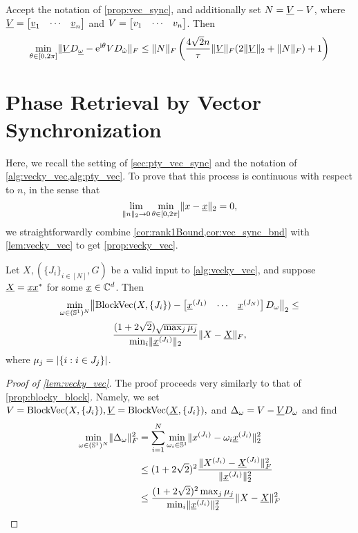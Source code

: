 \begin{corollary}
  Accept the notation of \cref{prop:vec_sync}, and additionally set $N = \underline{V} - V$, where $\underline{V} = \begin{bmatrix} \underline{v}_{1} & \cdots & \underline{v}_{n} \end{bmatrix}$ and $V = \begin{bmatrix} v_{1} & \cdots & v_{n} \end{bmatrix}$.  Then \begin{equation} \min_{\theta \in [0, 2\pi]} \lVert\underline{V} D_{\underline{\omega}} - \mathrm{e}^{\mathrm{i} \theta} V D_{\hat{\omega}}\rVert_F \le  \lVert N\rVert_F \left(\dfrac{4 \sqrt{2} n}{\tau} \lVert\underline{V}\rVert_F (2 \lVert\underline{V}\rVert_2 + \lVert N\rVert_F) + 1\right) \label{eq:vec_sync_bnd} \end{equation} \label{cor:vec_sync_bnd}
\end{corollary}

\section{Phase Retrieval by Vector Synchronization}
\label{app:vecky_vec}
Here, we recall the setting of \cref{sec:pty_vec_sync} and the notation of \cref{alg:vecky_vec,alg:pty_vec}.  To prove that this process is continuous with respect to $n$, in the sense that \[\lim_{\lVert n\rVert_2 \to 0} \min_{\theta \in [0, 2\pi]} \lVert x - \underline{x}\rVert_2 = 0,\] we straightforwardly combine \cref{cor:rank1Bound,cor:vec_sync_bnd} with \cref{lem:vecky_vec} to get \cref{prop:vecky_vec}.

\begin{lemma} \label{lem:vecky_vec}
  Let $X, (\{J_i\}_{i \in [N]}, G)$ be a valid input to \cref{alg:vecky_vec}, and suppose $\underline{X} = \underline{x} \underline{x}^*$ for some $\underline{x} \in \mathbb{C}^d$.  Then \begin{equation}\begin{gathered}\min_{\omega \in (\Sbb^1)^N} \norm*{\BlkVec(X, \{J_i\}) - \rowmatfl{\ux^{(J_1)}}{\ux^{(J_N)}} D_\omega}_2 \le \\ \dfrac{(1 + 2 \sqrt{2}) \sqrt{\max_j \mu_j}}{\min_i \norm{\ux^{(J_i)}}_2} \norm{X - \uX}_F,\end{gathered} \label{eq:vecky_vec_diff} \end{equation} where $\mu_j = \lvert\{i : i \in J_j\}\rvert$.
\end{lemma}

\begin{proof}[Proof of \cref{lem:vecky_vec}]
  The proof proceeds very similarly to that of \cref{prop:blocky_block}.  Namely, we set $V = \operatorname{BlockVec}(X, \{J_i\}), \underline{V} = \operatorname{BlockVec}(\underline{X}, \{J_i\}),$ and $\Delta_\omega = V - \underline{V} D_\omega$ and find
  \begin{align*}
    \min_{\omega \in (\mathbb{S}^1)^N} \lVert\Delta_\omega\rVert_F^2 &= \sum_{i = 1}^N \min_{\omega_i \in \mathbb{S}^1} \lVert x^{(J_i)} - \omega_i \underline{x}^{(J_i)}\rVert_2^2 \\
    &\le (1 + 2 \sqrt{2})^2 \dfrac{\lVert X^{(J_i)} - \underline{X}^{(J_i)}\rVert_F^2}{\lVert\underline{x}^{(J_i)}\rVert_2^2} \\
    &\le \frac{(1 + 2 \sqrt{2})^2 \max_j \mu_j}{\min_i \lVert\underline{x}^{(J_i)}\rVert_2^2} \lVert X - \underline{X}\rVert_F^2
  \end{align*}  
\end{proof}

